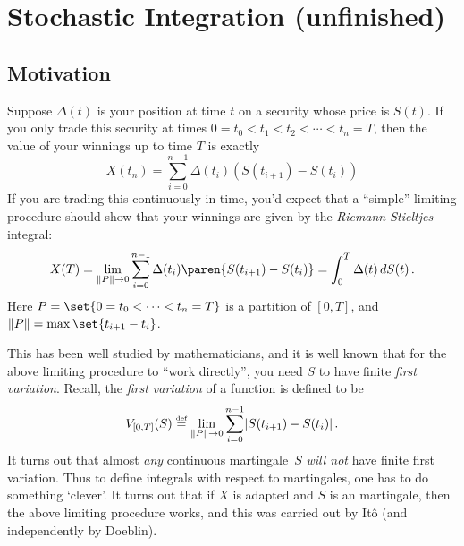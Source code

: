 
\ifstandalonechapter\setcounter{chapter}{2}\fi
\chapter{Stochastic Integration (unfinished)}

\section{Motivation}
Suppose $\Delta(t)$ is your position at time $t$ on a security whose price is $S(t)$.
If you only trade this security at times $0 = t_0 < t_1 < t_2 < \cdots < t_n = T$, then the value of your winnings up to time $T$ is exactly
\begin{equation*}
  X(t_n) = \sum_{i=0}^{n-1} \Delta(t_i) ( S(t_{i+1}) - S(t_i) )
\end{equation*}
If you are trading this continuously in time, you'd expect that a ``simple'' limiting procedure should show that your winnings are given by the \emph{Riemann-Stieltjes} integral:
\begin{equation*}%
  X(T) = 
    \lim_{\norm{P} \to 0}
      \sum_{i=0}^{n-1} \Delta(t_i) \paren{ S( t_{i+1} ) - S( t_i ) }
    = \int_0^T \Delta(t) \, dS(t) \,.
\end{equation*}
Here $P = \set{0 = t_0 < \cdots < t_n = T}$ is a partition of $[0, T]$, and $\norm{P} = \max\set{ t_{i+1} - t_i }$.


This has been well studied by mathematicians, and it is well known that for the above limiting procedure to ``work directly'', you need $S$ to have finite \emph{first variation}.
Recall, the \emph{first variation} of a function is defined to be
\begin{equation*}
  V_{[0,T]}(S) \stackrel{\scriptscriptstyle\textup{def}}{=} \lim_{\lVert P\rVert \to 0} \sum_{i=0}^{n-1} \lvert S(t_{i+1}) - S(t_i)\rvert\,.
\end{equation*}
It turns out that almost \emph{any} continuous martingale~$S$ \emph{will not} have finite first variation.
Thus to define integrals with respect to martingales, one has to do something `clever'.
It turns out that if $X$ is adapted and $S$ is an martingale, then the above limiting procedure works, and this was carried out by It\^o (and independently by Doeblin).

